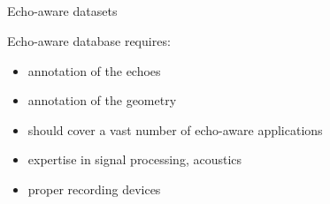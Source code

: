 \subsection{\dechorate}

\begin{frame}{Echo-aware datasets  \hfill\faBook}


    \vspace{1mm}
    \begin{block}{Echo-aware database requires:}
        \begin{itemize}
            \item annotation of the echoes
            \item annotation of the geometry
            \item should cover a vast number of echo-aware applications
            \item expertise in signal processing, acoustics
            \item proper recording devices
        \end{itemize}
    \end{block}

\end{frame}

